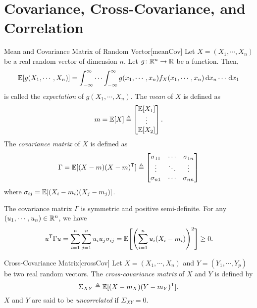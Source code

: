 \documentclass[../probability.tex]{subfiles}
\begin{document}
\section{Covariance, Cross-Covariance, and Correlation}

\begin{Definition}{Mean and Covariance Matrix of Random Vector}[meanCov]
    Let \(X = (X_1, \cdots, X_n)\) be a real random vector of dimension \(n\).
    Let \(g \colon \RR[n] \to \RR\) be a function. Then,
    \[
        \mathbb{E}[g(X_1, \cdots, X_n)] =
        \int_{-\infty}^{\infty} \cdots \int_{-\infty}^{\infty} g(x_1, \cdots, x_n) f_X(x_1, \cdots,
        x_n) \,\mathrm{d} x_n \cdots \,\mathrm{d} x_1
    \]
    is called the \emph{expectation} of \(g(X_1, \cdots, X_n)\).
    The \emph{mean} of \(X\) is defined as
    \[
        m = \mathbb{E}[X] \triangleq \begin{bmatrix}
            \mathbb{E}[X_1] \\ \vdots \\ \mathbb{E}[X_2]
        \end{bmatrix}\text.
    \]
    The \emph{covariance matrix} of \(X\) is defined as
    \[
        \Gamma = \mathbb{E}[(X-m)(X-m)^{\mathsf{T}}] \triangleq \begin{bmatrix}
            \sigma_{11} & \cdots & \sigma_{1n} \\
            \vdots & \ddots & \vdots \\
            \sigma_{n1} & \cdots & \sigma_{nn}
        \end{bmatrix}
    \]
    where \(\sigma_{ij} = \mathbb{E}[(X_i - m_i)(X_j - m_j)]\).
\end{Definition}

\begin{note}
    The covariance matrix \(\Gamma\) is symmetric and positive semi-definite.
    For any \((u_1, \cdots, u_n) \in \RR[n]\), we have
    \[
        u^{\mathsf{T}}\Gamma u
        = \sum_{i=1}^n \sum_{j=1}^n u_i u_j \sigma_{ij}
        = \mathbb{E}\Biggl[ \Biggl( \sum_{i=1}^n u_i(X_i-m_i) \Biggr)^2 \Biggr] \ge 0\text.
    \]
\end{note}

\begin{Definition}{Cross-Covariance Matrix}[crossCov]
    Let \(X = (X_1, \cdots, X_n)\) and \(Y = (Y_1, \cdots, Y_p)\)
    be two real random vectors. The \emph{cross-covariance matrix} of \(X\) and \(Y\)
    is defined by
    \[
        \Sigma_{XY} \triangleq \mathbb{E}[(X-m_X)(Y-m_Y)^{\mathsf{T}}]\text.
    \]
    \(X\) and \(Y\) are said to be \emph{uncorrelated} if \(\Sigma_{XY} = 0\).
\end{Definition}
\end{document}
